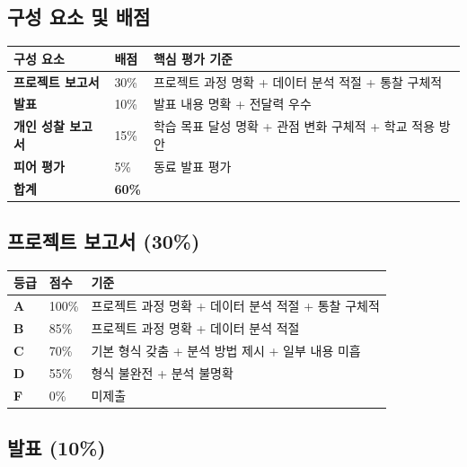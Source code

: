 \documentclass[11pt, a4paper]{article}
\begin{document}
\subsection{구성 요소 및 배점}

\begin{table}[h]
\centering
\begin{tabular}{|L{4cm}|C{1.5cm}|L{8cm}|}
\hline
{}
\textbf{구성 요소} & \textbf{배점} & \textbf{핵심 평가 기준} \\
\hline
\textbf{프로젝트 보고서} & 30\% & 프로젝트 과정 명확 + 데이터 분석 적절 + 통찰 구체적 \\
\hline
\textbf{발표} & 10\% & 발표 내용 명확 + 전달력 우수 \\
\hline
\textbf{개인 성찰 보고서} & 15\% & 학습 목표 달성 명확 + 관점 변화 구체적 + 학교 적용 방안 \\
\hline
\textbf{피어 평가} & 5\% & 동료 발표 평가 \\
\hline
\textbf{합계} & \textbf{60\%} & \\
\hline
\end{tabular}
\end{table}

\subsection{프로젝트 보고서 (30\%)}

\begin{table}[h]
\centering
\begin{tabular}{|C{1.5cm}|C{1.5cm}|L{10.5cm}|}
\hline
{}
\textbf{등급} & \textbf{점수} & \textbf{기준} \\
\hline
\textbf{A} & 100\% & 프로젝트 과정 명확 + 데이터 분석 적절 + 통찰 구체적 \\
\hline
\textbf{B} & 85\% & 프로젝트 과정 명확 + 데이터 분석 적절 \\
\hline
\textbf{C} & 70\% & 기본 형식 갖춤 + 분석 방법 제시 + 일부 내용 미흡 \\
\hline
\textbf{D} & 55\% & 형식 불완전 + 분석 불명확 \\
\hline
\textbf{F} & 0\% & 미제출 \\
\hline
\end{tabular}
\end{table}

\subsection{발표 (10\%)}
\end{document}
